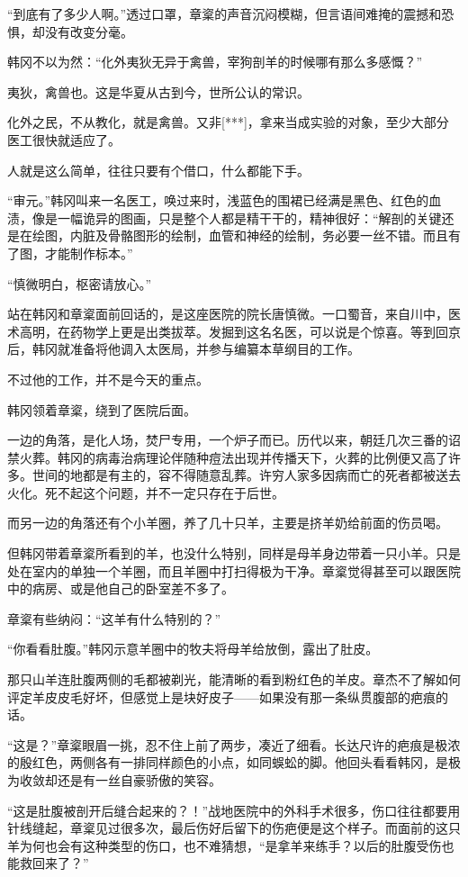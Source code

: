 “到底有了多少人啊。”透过口罩，章楶的声音沉闷模糊，但言语间难掩的震撼和恐惧，却没有改变分毫。

韩冈不以为然：“化外夷狄无异于禽兽，宰狗剖羊的时候哪有那么多感慨？”

夷狄，禽兽也。这是华夏从古到今，世所公认的常识。

化外之民，不从教化，就是禽兽。又非[***]，拿来当成实验的对象，至少大部分医工很快就适应了。

人就是这么简单，往往只要有个借口，什么都能下手。

“审元。”韩冈叫来一名医工，唤过来时，浅蓝色的围裙已经满是黑色、红色的血渍，像是一幅诡异的图画，只是整个人都是精干干的，精神很好：“解剖的关键还是在绘图，内脏及骨骼图形的绘制，血管和神经的绘制，务必要一丝不错。而且有了图，才能制作标本。”

“慎微明白，枢密请放心。”

站在韩冈和章楶面前回话的，是这座医院的院长唐慎微。一口蜀音，来自川中，医术高明，在药物学上更是出类拔萃。发掘到这名名医，可以说是个惊喜。等到回京后，韩冈就准备将他调入太医局，并参与编纂本草纲目的工作。

不过他的工作，并不是今天的重点。

韩冈领着章楶，绕到了医院后面。

一边的角落，是化人场，焚尸专用，一个炉子而已。历代以来，朝廷几次三番的诏禁火葬。韩冈的病毒治病理论伴随种痘法出现并传播天下，火葬的比例便又高了许多。世间的地都是有主的，容不得随意乱葬。许穷人家多因病而亡的死者都被送去火化。死不起这个问题，并不一定只存在于后世。

而另一边的角落还有个小羊圈，养了几十只羊，主要是挤羊奶给前面的伤员喝。

但韩冈带着章楶所看到的羊，也没什么特别，同样是母羊身边带着一只小羊。只是处在室内的单独一个羊圈，而且羊圈中打扫得极为干净。章楶觉得甚至可以跟医院中的病房、或是他自己的卧室差不多了。

章楶有些纳闷：“这羊有什么特别的？”

“你看看肚腹。”韩冈示意羊圈中的牧夫将母羊给放倒，露出了肚皮。

那只山羊连肚腹两侧的毛都被剃光，能清晰的看到粉红色的羊皮。章杰不了解如何评定羊皮皮毛好坏，但感觉上是块好皮子——如果没有那一条纵贯腹部的疤痕的话。

“这是？”章楶眼眉一挑，忍不住上前了两步，凑近了细看。长达尺许的疤痕是极浓的殷红色，两侧各有一排同样颜色的小点，如同蜈蚣的脚。他回头看看韩冈，是极为收敛却还是有一丝自豪骄傲的笑容。

“这是肚腹被剖开后缝合起来的？！”战地医院中的外科手术很多，伤口往往都要用针线缝起，章楶见过很多次，最后伤好后留下的伤疤便是这个样子。而面前的这只羊为何也会有这种类型的伤口，也不难猜想，“是拿羊来练手？以后的肚腹受伤也能救回来了？”

